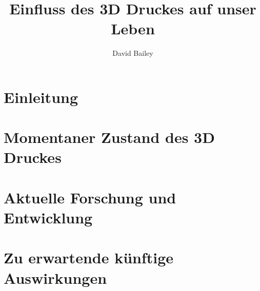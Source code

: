 \documentclass[11pt,a4paper]{article}
\author{David Bailey}
\title{Einfluss des 3D Druckes auf unser Leben}
\begin{document}
\onehalfspacing




\pagestyle{empty}
\tableofcontents

\newpage
\pagestyle{plain}
\section{Einleitung}


\newpage
\section{Momentaner Zustand des 3D Druckes}


\newpage
\section{Aktuelle Forschung und Entwicklung}


\newpage
\section{Zu erwartende künftige Auswirkungen}



\newpage

\printbibliography[heading=bibintoc]

\newpage

\end{document}
